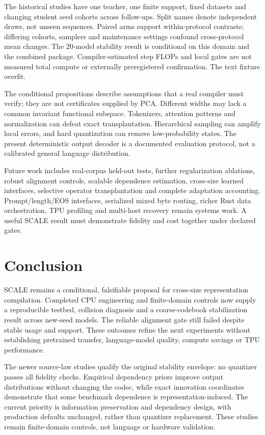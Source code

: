 \documentclass[11pt,a4paper]{article}
\begin{document}
The historical studies have one teacher, one finite support, fixed datasets and changing
student seed cohorts across follow-ups. Split names denote independent draws,
not unseen sequences. Paired arms support within-protocol contrasts; differing
cohorts, samplers and maintenance settings confound cross-protocol mean changes.
The 20-model stability result is conditional on this domain and the combined
package. Compiler-estimated step FLOPs and local gates are not measured total
compute or externally preregistered confirmation. The text fixture overfit.

The conditional propositions describe assumptions that a real compiler must
verify; they are not certificates supplied by PCA. Different widths may lack a
common invariant functional subspace. Tokenizers, attention patterns and
normalization can defeat exact transplantation. Hierarchical sampling can
amplify local errors, and hard quantization can remove low-probability states.
The present deterministic output decoder is a documented evaluation protocol,
not a calibrated general language distribution.

Future work includes real-corpus held-out tests, further regularization ablations,
robust alignment controls, scalable dependence estimation, cross-size learned
interfaces, selective operator transplantation and complete adaptation accounting.
Prompt/length/EOS interfaces, serialized mixed byte routing, richer Rust data
orchestration, TPU profiling and multi-host recovery remain systems work. A useful SCALE result
must demonstrate fidelity and cost together under declared gates.

\section{Conclusion}
SCALE remains a conditional, falsifiable proposal for cross-size representation
compilation. Completed CPU engineering and finite-domain controls now supply a
reproducible testbed, collision diagnosis and a coarse-codebook stabilization
result across \StabilityModels{} new-seed models. The reliable alignment gate
still failed despite stable usage and support. These outcomes refine the next
experiments without establishing pretrained transfer, language-model quality,
compute savings or TPU performance.

The newer source-law studies qualify the original stability envelope: no
quantizer passes all fidelity checks. Empirical dependency priors improve
output distributions without changing the codec, while exact innovation
coordinates demonstrate that some benchmark dependence is representation-induced.
The current priority is information preservation and dependency design, with
production defaults unchanged, rather than quantizer replacement. These studies
remain finite-domain controls, not language or hardware validation.


\end{document}
